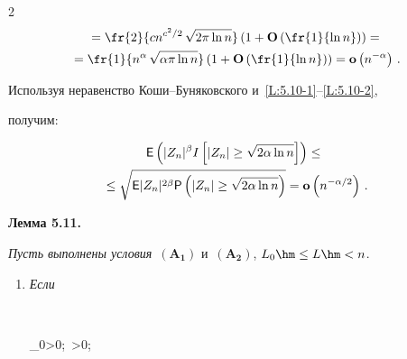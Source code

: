 \begin{multicols}{2}
\begin{multline*}
   {}=


 \fr{2}{cn^{c^2/2}\,\sqrt{2\pi\ln n}}


 \left(1+\Op\left(\fr{1}{\ln n}\right)\right)={}


\\


  {}  = \fr{1}{n^{\alpha}\,\sqrt{\alpha\pi\ln n}}


 \left(1+\Op\left(\fr{1}{\ln n}\right)\right)= \op\left(n^{-\alpha}\right)\,.


 \end{multline*}





 Используя неравенство Ко\-ши--Бу\-ня\-ков\-ско\-го и~\eqref{L:5.10-1}--\eqref{L:5.10-2},


 получим:


 


 \noindent


 \begin{multline*}


  \Ep \left( |Z_n|^\beta I\left[|Z_n|\ge \sqrt{2\alpha\ln n}\right]\right)


 \le{}\\


 {}\le


 \sqrt{\Ep |Z_n|^{2\beta}


  {\sf P}\left(|Z_n|\ge \sqrt{2\alpha\ln n}\right)}=


 \op\left(n^{-\alpha/2}\right)\,.


 \end{multline*}


 


 \vspace*{-2pt}








\noindent


\textbf{Лемма 5.11.}\


\textit{Пусть выполнены условия}~$\mathbf{(A_1)}$ и~$\mathbf{(A_2)}$, $L_0\hm\le L \hm<n$.


\begin{enumerate}[1.]


\item


\textit{Если} 


$$


\hspace*{-4pt}\delta_0>0;\ \beta>0;\



\end{enumerate}
\end{multicols}
